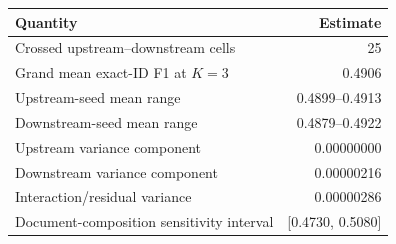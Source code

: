 \begin{tabular}{lr}
\toprule
Quantity & Estimate \\
\midrule
Crossed upstream--downstream cells & 25 \\
Grand mean exact-ID F1 at $K=3$ & 0.4906 \\
Upstream-seed mean range & 0.4899--0.4913 \\
Downstream-seed mean range & 0.4879--0.4922 \\
Upstream variance component & 0.00000000 \\
Downstream variance component & 0.00000216 \\
Interaction/residual variance & 0.00000286 \\
Document-composition sensitivity interval & [0.4730, 0.5080] \\
\bottomrule
\end{tabular}
